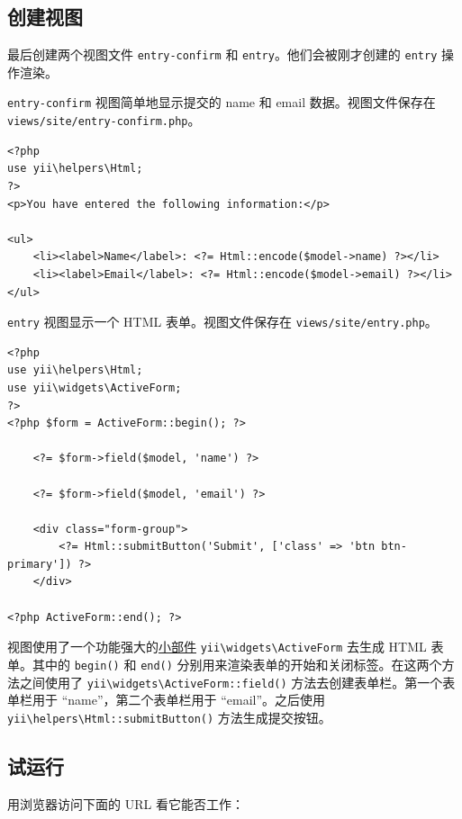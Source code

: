 \subsection{创建视图 \label{start-forms.md::creating-views}}
最后创建两个视图文件 \lstinline|entry-confirm| 和 \lstinline|entry|。他们会被刚才创建的 \lstinline|entry| 操作渲染。

\lstinline|entry-confirm| 视图简单地显示提交的 name 和 email 数据。视图文件保存在 \lstinline|views/site/entry-confirm.php|。

\lstset{language=php}\begin{lstlisting}
<?php
use yii\helpers\Html;
?>
<p>You have entered the following information:</p>

<ul>
    <li><label>Name</label>: <?= Html::encode($model->name) ?></li>
    <li><label>Email</label>: <?= Html::encode($model->email) ?></li>
</ul>
\end{lstlisting}
\lstinline|entry| 视图显示一个 HTML 表单。视图文件保存在 \lstinline|views/site/entry.php|。

\lstset{language=php}\begin{lstlisting}
<?php
use yii\helpers\Html;
use yii\widgets\ActiveForm;
?>
<?php $form = ActiveForm::begin(); ?>

    <?= $form->field($model, 'name') ?>

    <?= $form->field($model, 'email') ?>

    <div class="form-group">
        <?= Html::submitButton('Submit', ['class' => 'btn btn-primary']) ?>
    </div>

<?php ActiveForm::end(); ?>
\end{lstlisting}
视图使用了一个功能强大的\hyperref[structure-widgets.md]{小部件} \texttt{yii{\allowbreak{}\textbackslash}widgets{\allowbreak{}\textbackslash}ActiveForm} 去生成 HTML 表单。其中的 \lstinline|begin()| 和 \lstinline|end()| 分别用来渲染表单的开始和关闭标签。在这两个方法之间使用了 \texttt{yii{\allowbreak{}\textbackslash}widgets{\allowbreak{}\textbackslash}ActiveForm\allowbreak{}::\allowbreak{}field()} 方法去创建表单栏。第一个表单栏用于 “name”，第二个表单栏用于 “email”。之后使用 \texttt{yii{\allowbreak{}\textbackslash}helpers{\allowbreak{}\textbackslash}Html\allowbreak{}::\allowbreak{}submitButton()} 方法生成提交按钮。

\subsection{试运行 \label{start-forms.md::trying-it-out}}
用浏览器访问下面的 URL 看它能否工作：

